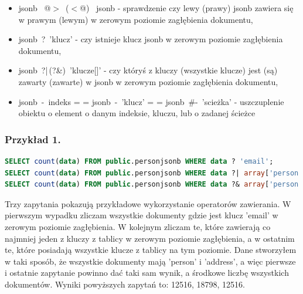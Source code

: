 \documentclass[a4paper,12pt,table]{article}
\makeatletter
\newcommand{\inlineitem}[1][]{%
\ifnum\enit@type=\tw@
    {\descriptionlabel{#1}}
  \hspace{\labelsep}%
\else
  \ifnum\enit@type=\z@
       \refstepcounter{\@listctr}\fi
    \quad\@itemlabel\hspace{\labelsep}%
\fi}
\makeatother
\begin{document}
{\newpage
\begin{itemize}
\item jsonb \, @$>$ \,($<$@) \, jsonb - sprawdzenie czy lewy (prawy) jsonb zawiera się w prawym (lewym) w zerowym poziomie zagłębienia dokumentu,
\item jsonb\, ?\, 'klucz' - czy istnieje klucz jsonb w zerowym poziomie zagłębienia dokumentu,
\item jsonb\, ?|\,(?\&)\, 'klucze[]' - czy któryś z kluczy (wszystkie klucze) jest (są) zawarty (zawarte) w jsonb w zerowym poziomie zagłębienia dokumentu,
\item  jsonb \,-\, indeks \inlineitem jsonb \,-\, 'klucz' \inlineitem jsonb\, \#-\, '{scieżka}' - uszczuplenie obiektu o element o danym indeksie, kluczu, lub o zadanej ścieżce
\end{itemize}
\subsubsection*{Przykład 1.}
\begin{lstlisting}[language=SQL,basicstyle=\footnotesize]
SELECT count(data) FROM public.personjsonb WHERE data ? 'email';
SELECT count(data) FROM public.personjsonb WHERE data ?| array['person','address','email'];
SELECT count(data) FROM public.personjsonb WHERE data ?& array['person','address','email'];
\end{lstlisting}
\vspace{0.5cm}
Trzy zapytania pokazują przykładowe wykorzystanie operatorów zawierania. W pierwszym wypadku zliczam wszystkie dokumenty gdzie jest klucz 'email' w zerowym poziomie zagłębienia. W kolejnym zliczam te, które zawierają co najmniej jeden z kluczy z tablicy w zerowym poziomie zagłębienia, a w ostatnim te, które posiadają wszystkie klucze z tablicy na tym poziomie. Dane stworzyłem w taki sposób, że wszystkie dokumenty mają 'person' i 'address', a więc pierwsze i ostatnie zapytanie powinno dać taki sam wynik, a środkowe liczbę wszystkich dokumentów. Wyniki powyższych zapytań to: 12516, 18798, 12516.
}
\end{document}
